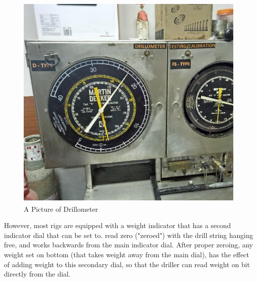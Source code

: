 \vspace{2em}

\begin{figure}[H]
\includegraphics[scale=0.2]{images/drillometer}
\centering 
\caption{A Picture of Drillometer}
\end{figure}

\vspace{2em}


 However, most rigs are equipped with a
weight indicator that has a second indicator dial that can be set to.
read zero ("zeroed") with the drill string hanging free, and works
backwards from the main indicator dial. After proper zeroing, any
weight set on bottom (that takes weight away from the main dial), has
the effect of adding weight to this secondary dial, so that the driller
can read weight on bit directly from the dial.